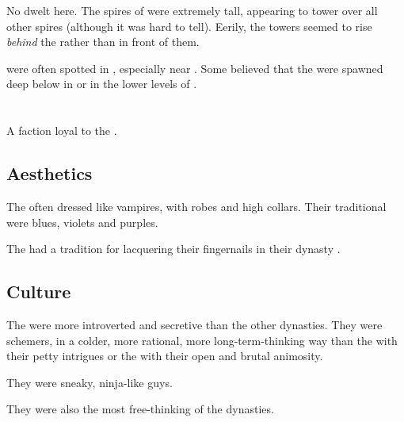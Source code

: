 No \resphain dwelt here. 
The spires of \Carcosa were extremely tall, appearing to tower over all other spires (although it was hard to tell). 
Eerily, the towers seemed to rise \emph{behind} the  rather than in front of them. 

\Umbrae were often spotted in \Oggra, especially near \Carcosa.
Some believed that the \umbrae were spawned deep below in \Oggra or in the lower levels of \Carcosa. 















\section{\TiphredSerah}
A \resphan{} faction loyal to the \banes. 









\subsection{Aesthetics}

The \TiphredSerah{} often dressed like vampires, with robes and high collars. 
Their traditional \colours were blues, violets and purples.

The \TiphredSerah{} had a tradition for lacquering their fingernails in their dynasty \colours. 









\subsection{Culture}
The \TiphredSerah{} were more introverted and secretive than the other dynasties. 
They were schemers, in a colder, more rational, more long-term-thinking way than the \CiriathSepher{} with their petty intrigues or the \Mystraacht{} with their open and brutal animosity. 

They were sneaky, ninja-like guys. 

They were also the most free-thinking of the dynasties. 


